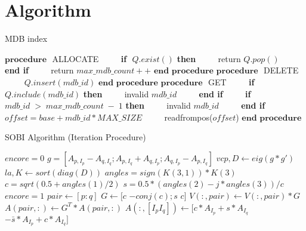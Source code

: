 \documentclass[conference]{IEEEtran}
\begin{document}
\section{Algorithm}
\begin{algorithm}[!h]
	\caption{MDB index}
	\begin{algorithmic}[1]
		\STATE $\textbf{procedure}$ $ $ ALLOCATE
		\STATE $\qquad$ \textbf{if} $ $ $Q.exist()$ $ $\textbf{then}
		\STATE $\qquad$ \; return $Q.pop()$
		\STATE $\qquad$ \textbf{end if}
		\STATE $\qquad$ return $max\_mdb\_count++$
		\STATE $\textbf{end procedure}$\newline
		\STATE $\textbf{procedure}$ $ $ DELETE
		\STATE $\qquad$ $Q.insert(mdb\_id)$
		\STATE $\textbf{end procedure}$\newline
		\STATE $\textbf{procedure}$ $ $ GET
		\STATE $\qquad$ \textbf{if} $ $ $ Q.include(mdb\_id)$ $ $\textbf{then}
		\STATE $\qquad$ \; invalid $mdb\_id$
		\STATE $\qquad$ \textbf{end if}
		\STATE $\qquad$ \textbf{if} $ $ $mdb\_id\; > \; max\_mdb\_count \; - \; 1$ $ $\textbf{then}
		\STATE $\qquad$ \; invalid $mdb\_id$
		\STATE $\qquad$ \textbf{end if}
		\STATE $\qquad$ $offset = base + mdb\_id * MAX\_SIZE$
		\STATE $\qquad$ readfrompos($offset$)
		\STATE $\textbf{end procedure}$
	\end{algorithmic}
\end{algorithm}

\begin{algorithm}[!h]
	\caption{SOBI Algorithm (Iteration Procedure)}
	\begin{algorithmic}[1]
		\STATE $encore=0$
		\STATE $g=[A_{p,I_{p}}-A_{q,I_{q}};A_{p,I_{q}}+A_{q,I_{p}};A_{q,I_{p}}-A_{p,I_{q}}] $
		\STATE $vcp,D \gets eig(g*g')$
		\STATE $la,K \gets sort(diag(D))$
		\STATE $angles=sign(K(3,1))*K(3)$
		\STATE $c=sqrt(0.5+angles(1)/2)$
		\STATE $s=0.5*(angles(2)-j*angles(3))/c$
		\STATE $encore=1$
		\STATE $pair \gets [p:q]$
		\STATE $G \gets [c$ $-conj(c);s$ $c]$
		\STATE $V(:,pair) \gets V(:,pair)*G$
		\STATE $A(pair,:) \gets G^T*A(pair,:)$
		\STATE $A(:,[I_{p} I_{q}]) \gets [c*A_{I_{p}}+s*A_{I_{q}}$ $-\bar{s}*A_{I_{p}}+c*A_{I_{q}}]$
		\ENDIF
		\ENDFOR
		\ENDFOR
		\ENDWHILE
	\end{algorithmic}
\end{algorithm}
\end{document}
